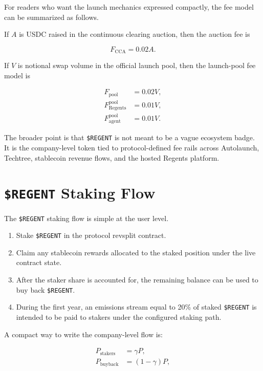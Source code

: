 \documentclass[11pt]{article}
\newcommand{\REGENT}{\texttt{\$REGENT}}
\newcommand{\USDC}{\textsc{USDC}}
\begin{document}
For readers who want the launch mechanics expressed compactly, the fee model can be summarized as follows.

If \(A\) is \USDC{} raised in the continuous clearing auction, then the auction fee is

\begin{equation}
F_{\text{CCA}} = 0.02A.
\end{equation}

If \(V\) is notional swap volume in the official launch pool, then the launch-pool fee model is

\begin{align}
F_{\text{pool}} &= 0.02V, \\
F_{\text{Regents}}^{\text{pool}} &= 0.01V, \\
F_{\text{agent}}^{\text{pool}} &= 0.01V.
\end{align}

The broader point is that \REGENT{} is not meant to be a vague ecosystem badge. It is the company-level token tied to protocol-defined fee rails across Autolaunch, Techtree, stablecoin revenue flows, and the hosted Regents platform.

\section{\texorpdfstring{\REGENT}{\$REGENT} Staking Flow}

The \REGENT{} staking flow is simple at the user level.

\begin{enumerate}[leftmargin=1.5em]
  \item Stake \REGENT{} in the protocol revsplit contract.
  \item Claim any stablecoin rewards allocated to the staked position under the live contract state.
  \item After the staker share is accounted for, the remaining balance can be used to buy back \REGENT.
  \item During the first year, an emissions stream equal to 20\% of staked \REGENT{} is intended to be paid to stakers under the configured staking path.
\end{enumerate}

A compact way to write the company-level flow is:

\begin{align}
P_{\text{stakers}} &= \gamma P, \\
P_{\text{buyback}} &= (1-\gamma)P,
\end{align}
\end{document}
